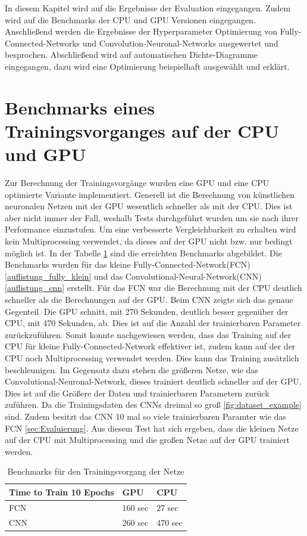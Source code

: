 In diesem Kapitel wird auf die Ergebnisse der Evaluation eingegangen. Zudem wird auf die Benchmarks der CPU und GPU Versionen eingegangen. Anschließend werden die Ergebnisse der Hyperparameter Optimierung von Fully-Connected-Networks und Convolution-Neuronal-Networks ausgewertet und besprochen. Abschließend wird auf automatischen Dichte-Diagramme eingegangen, dazu wird eine Optimierung beispielhaft ausgewählt und erklärt. 

\section{Benchmarks eines Trainingsvorganges auf der CPU und GPU}
Zur Berechnung der Trainingsvorgänge wurden eine GPU und eine CPU optimierte Variante implementiert. Generell ist die Berechnung von künstlichen neuronalen Netzen mit der GPU wesentlich schneller als mit der CPU. Dies ist aber nicht immer der Fall, weshalb Tests durchgeführt wurden um sie nach ihrer Performance einzustufen. Um eine verbesserte Vergleichbarkeit zu erhalten wird kein Multiprocessing verwendet, da dieses auf der GPU nicht bzw. nur bedingt möglich ist. In der Tabelle \ref{tab:benchmarks} sind die erreichten Benchmarks abgebildet. Die Benchmarks wurden für das kleine Fully-Connected-Network(FCN) \ref{auflistung_fully_klein} und das Convolutional-Neural-Network(CNN) \ref{auflistung_cnn} erstellt. Für das FCN war die Berechnung mit der CPU deutlich schneller als die Berechnungen auf der GPU. Beim CNN zeigte sich das genaue Gegenteil. Die GPU schnitt, mit 270 Sekunden, deutlich besser gegenüber der CPU, mit 470 Sekunden, ab. Dies ist auf die Anzahl der trainierbaren Parameter zurückzuführen. Somit konnte nachgewiesen werden, dass das Training auf der CPU für kleine Fully-Connected-Network effektiver ist, zudem kann auf der der CPU noch Multiprocessing verwendet werden. Dies kann das Training zusätzlich beschleunigen. Im Gegensatz dazu stehen die größeren Netze, wie das Convolutional-Neuronal-Network, dieses trainiert deutlich schneller auf der GPU. Dies ist auf die Größere der Daten und trainierbaren Parametern zurück zuführen. Da die Trainingsdaten des CNNs dreimal so groß \ref{fig:dataset_example} sind. Zudem besitzt das CNN 10 mal so viele trainierbaren Paramter wie das FCN \ref{sec:Evaluierung}. Aus diesem Test hat sich ergeben, dass die kleinen Netze auf der CPU mit Multiprocessing und die großen Netze auf der GPU trainiert werden.


\begin{table}[h]
\centering
\caption{Benchmarks für den Trainingsvorgang der Netze}
\label{tab:benchmarks}
\begin{tabular}{lll} \toprule
Time to Train 10 Epochs & GPU     & CPU      \\\midrule
FCN                     & 160 sec & 27 sec   \\
CNN                     & 260 sec & 470 sec \\\bottomrule
\end{tabular}
\end{table}


